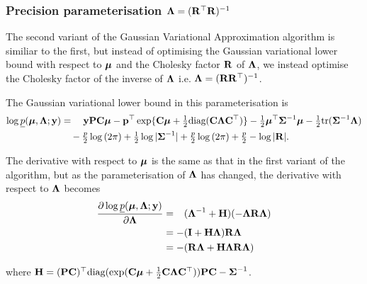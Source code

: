 	\subsubsection{Precision parameterisation ${\boldsymbol \Lambda} = ({\bf R}^\top {\bf R})^{-1}$}
			
	\noindent The second variant of the Gaussian Variational Approximation algorithm is similiar to the first, but
	instead of optimising the Gaussian variational lower bound with respect to ${\boldsymbol \mu}$ and the Cholesky factor
	${\bf R}$ of ${\boldsymbol \Lambda}$, we instead optimise the Cholesky factor of the inverse of ${\boldsymbol \Lambda}$ i.e. ${\boldsymbol \Lambda} =
	({\bf R} {\bf R}^\top)^{-1}$.
	
	The Gaussian variational lower bound in this parameterisation is
	\begin{align*}
		\log \underline{p}({\boldsymbol \mu}, {\boldsymbol \Lambda}; {\bf y}) & = \quad {\bf y}{\bf P}{\bf C} {\boldsymbol\mu} - {\bf p}^\top \exp\{{\bf C} {\boldsymbol \mu} + \tfrac{1}{2} \text{diag}({\bf C} {\boldsymbol \Lambda} {\bf C}^\top)\} - \tfrac{1}{2} {\boldsymbol \mu}^\top {\boldsymbol\Sigma}^{-1} {\boldsymbol \mu} - \tfrac{1}{2} \text{tr}{({\boldsymbol\Sigma}^{-1} {\boldsymbol\Lambda})} \\
		                                        & \quad- \tfrac{p}{2} \log{(2 \pi)} + \tfrac{1}{2} \log{|{\boldsymbol\Sigma}^{-1}|} + \tfrac{p}{2} \log{(2 \pi)} + \tfrac{p}{2} - \log{|{\bf R}|}.                                             
	\end{align*}
			
	\noindent The derivative with respect to ${\boldsymbol \mu}$ is the same as that in the first variant of the algorithm, but 
	as the parameterisation of ${\boldsymbol \Lambda}$ has changed, the  derivative with respect to ${\boldsymbol \Lambda}$ becomes
	\begin{align*}
		\frac{\partial \log \underline{p}({\boldsymbol \mu}, {\boldsymbol \Lambda}; {\bf y})}{\partial {\boldsymbol\Lambda}}
		  & = \hphantom{-}({\boldsymbol \Lambda}^{-1} + {\bf H})(-{\boldsymbol \Lambda} {\bf R} {\boldsymbol \Lambda}) \\
		  & = -({\bf I} + {\bf H}{\boldsymbol \Lambda}){\bf R}{\boldsymbol \Lambda}                           \\
		  & = - ({\bf R}{\boldsymbol \Lambda} + {\bf H}{\boldsymbol \Lambda}{\bf R}{\boldsymbol \Lambda})                  
	\end{align*} 
			
	\noindent where ${\bf H} = ({\bf P} {\bf C})^\top \text{diag}(\exp({\bf C} {\boldsymbol \mu} + \frac{1}{2} {\bf C} {\boldsymbol \Lambda} {\bf C}^\top)) {\bf P} {\bf C} - {\boldsymbol \Sigma}^{-1}$.
			
